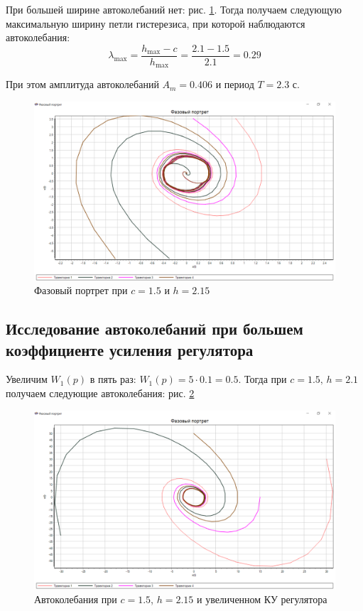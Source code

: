 	При большей ширине автоколебаний нет: рис. \ref{s_lambda5}. Тогда получаем следующую максимальную ширину петли гистерезиса, при которой наблюдаются автоколебания:
	\begin{equation*}
		\lambda_{\max} = \frac{h_{\max}-c}{h_{\max}} = \frac{2.1-1.5}{2.1} = 0.29
	\end{equation*}
	
	При этом амплитуда автоколебаний $A_m = 0.406$ и период $T = 2.3$ с.
	
	
	\begin{figure}[h]
		\centering\includegraphics[width=.5\textwidth]{png/FP_lambda5.png}
		\caption{Фазовый портрет при $c=1.5$ и $h=2.15$}
		\label{s_lambda5}
	\end{figure}
	
	\subsection[Автоколебания при большем КУ регулятора]{Исследование автоколебаний при большем коэффициенте усиления регулятора}
	
	Увеличим $W_1(p)$ в пять раз: $W_1(p) = 5\cdot0.1 = 0.5$. Тогда при $c=1.5,\, h=2.1$ получаем следующие автоколебания: рис. \ref{s_lambda6}
	
	\begin{figure}[h]
		\centering\includegraphics[width=.7\textwidth]{png/FP_lambda6.png}
		\caption{Автоколебания при $c=1.5$, $h=2.15$ и увеличенном КУ регулятора}
		\label{s_lambda6}
	\end{figure}
	
